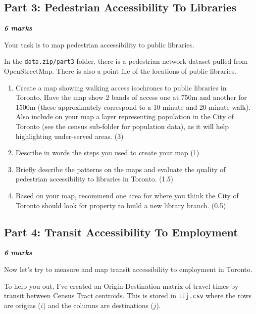 \documentclass[11pt]{article}
\begin{document}
	
	
	
	\subsection*{Part 3: Pedestrian Accessibility To Libraries} 
	
	\vspace{-2mm}
	\textbf{\textit{6 marks}}
	
	Your task is to map pedestrian accessibility to public libraries. 
	
	In the \texttt{data.zip/part3} folder, there is a pedestrian network dataset pulled from OpenStreetMap. There is also a point file of the locations of public libraries.
	
	
	\begin{enumerate}
		\item Create a map showing walking access isochrones to public libraries in Toronto. Have the map show 2 bands of access one at 750m and another for 1500m (these approximately correspond to a 10 minute and 20 minute walk). Also include on your map a layer representing population in the City of Toronto (see the census sub-folder for population data), as it will help highlighting under-served areas. (3)

		\item Describe in words the steps you used to create your map (1)
		
		\item Briefly describe the patterns on the maps and evaluate the quality of pedestrian accessibility to libraries in Toronto. (1.5)
		
		\item Based on your map, recommend one area for where you think the City of Toronto should look for property to build a new library branch. (0.5)
		
	\end{enumerate}
	
	
	
	\subsection*{Part 4: Transit Accessibility To Employment}
	
	\textbf{\textit{6 marks}}
	
	Now let's try to measure and map transit accessibility to employment in Toronto.
	
	To help you out, I've created an Origin-Destination matrix of travel times by transit between Census Tract centroids. This is stored in \texttt{tij.csv} where the rows are origins ($i$) and the columns are destinations ($j$).
	
\end{document}
